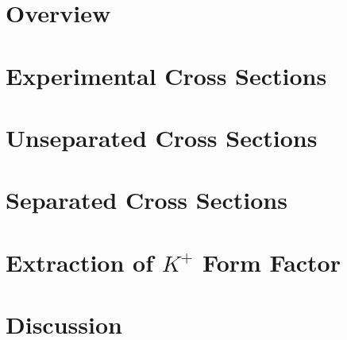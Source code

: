 \label{Chapter-9}

\hypertarget{Section-9.1}{%
\section{Overview}\label{Section-9.1}}

\hypertarget{Section-9.2}{%
\section{Experimental Cross Sections}\label{Section-9.2}}

\hypertarget{Section-9.3}{%
\section{Unseparated Cross Sections}\label{Section-9.3}}

\hypertarget{Section-9.4}{%
\section{Separated Cross Sections}\label{Section-9.4}}

\hypertarget{Section-9.5}{%
\section{\texorpdfstring{Extraction of \(K^{+}\) Form
Factor}{Extraction of K\^{}\{+\} Form Factor}}\label{Section-9.5}}

\hypertarget{Section-9.6}{%
\section{Discussion}\label{Section-9.6}}


